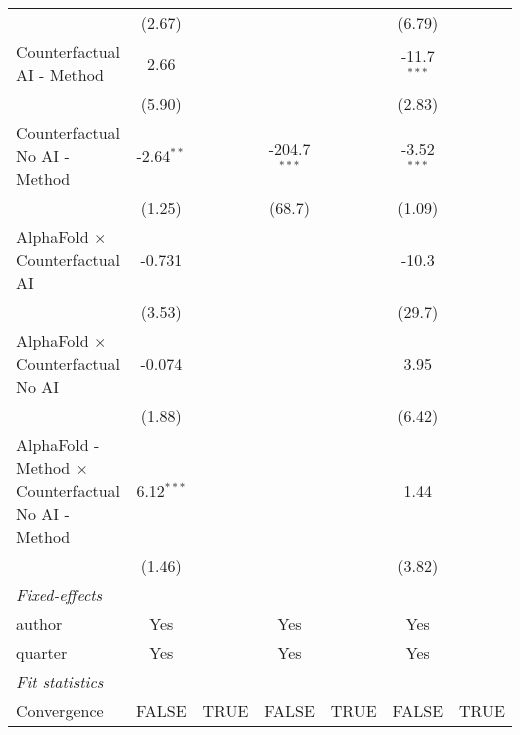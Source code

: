 \begin{tabular}{lcccccc}
                                                              & (2.67)        &      &                &      & (6.79)        &   \\   
   Counterfactual AI - Method                                 & 2.66          &      &                &      & -11.7$^{***}$ &   \\   
                                                              & (5.90)        &      &                &      & (2.83)        &   \\   
   Counterfactual No AI - Method                              & -2.64$^{**}$  &      & -204.7$^{***}$ &      & -3.52$^{***}$ &   \\   
                                                              & (1.25)        &      & (68.7)         &      & (1.09)        &   \\   
   AlphaFold $\times$ Counterfactual AI                       & -0.731        &      &                &      & -10.3         &   \\   
                                                              & (3.53)        &      &                &      & (29.7)        &   \\   
   AlphaFold $\times$ Counterfactual No AI                    & -0.074        &      &                &      & 3.95          &   \\   
                                                              & (1.88)        &      &                &      & (6.42)        &   \\   
   AlphaFold - Method $\times$ Counterfactual No AI - Method  & 6.12$^{***}$  &      &                &      & 1.44          &   \\   
                                                              & (1.46)        &      &                &      & (3.82)        &   \\   
   \midrule
   \emph{Fixed-effects}\\
   author                                                     & Yes           &      & Yes            &      & Yes           & \\  
   quarter                                                    & Yes           &      & Yes            &      & Yes           & \\  
   \midrule
   \emph{Fit statistics}\\
   Convergence                                                &FALSE          & TRUE & FALSE          & TRUE & FALSE         & TRUE\\  

\end{tabular}
